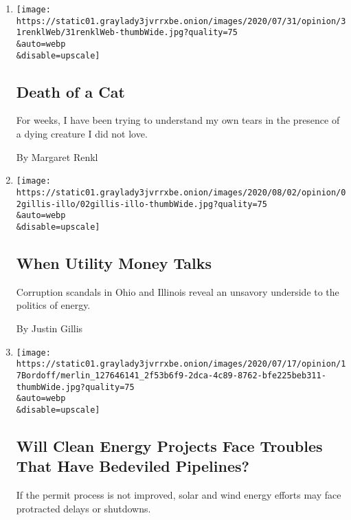 \begin{enumerate}
\def\labelenumi{\arabic{enumi}.}
\item
  \href{/2020/08/03/opinion/feral-cat-dying.html}{}

  \texttt{[image: https://static01.graylady3jvrrxbe.onion/images/2020/07/31/opinion/31renklWeb/31renklWeb-thumbWide.jpg?quality=75\\\&auto=webp\\\&disable=upscale]}

  \hypertarget{death-of-a-cat}{%
  \subsection{Death of a Cat}\label{death-of-a-cat}}

  For weeks, I have been trying to understand my own tears in the
  presence of a dying creature I did not love.

  By Margaret Renkl
\item
  \href{/2020/08/02/opinion/utility-corruption-energy.html}{}

  \texttt{[image: https://static01.graylady3jvrrxbe.onion/images/2020/08/02/opinion/02gillis-illo/02gillis-illo-thumbWide.jpg?quality=75\\\&auto=webp\\\&disable=upscale]}

  \hypertarget{when-utility-money-talks}{%
  \subsection{When Utility Money Talks}\label{when-utility-money-talks}}

  Corruption scandals in Ohio and Illinois reveal an unsavory underside
  to the politics of energy.

  By Justin Gillis
\item
  \href{/2020/07/20/opinion/pipelines-clean-energy.html}{}

  \texttt{[image: https://static01.graylady3jvrrxbe.onion/images/2020/07/17/opinion/17Bordoff/merlin\_127646141\_2f53b6f9-2dca-4c89-8762-bfe225beb311-thumbWide.jpg?quality=75\\\&auto=webp\\\&disable=upscale]}

  \hypertarget{will-clean-energy-projects-face-troubles-that-have-bedeviled-pipelines}{%
  \subsection{Will Clean Energy Projects Face Troubles That Have
  Bedeviled
  Pipelines?}\label{will-clean-energy-projects-face-troubles-that-have-bedeviled-pipelines}}

  If the permit process is not improved, solar and wind energy efforts
  may face protracted delays or shutdowns.


\end{enumerate}

